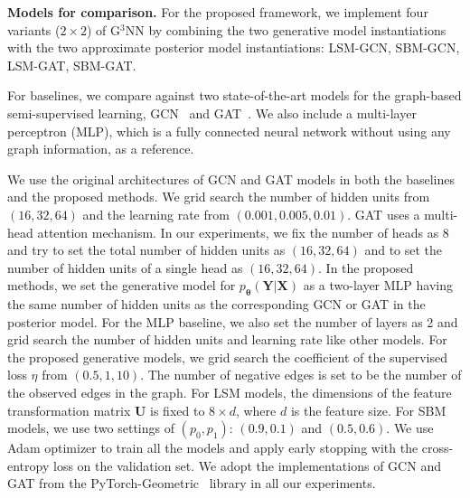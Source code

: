 \documentclass{article}
\newcommand{\vpara}[1]{\vspace{0.05in}\noindent\textbf{#1 }}
\def\rmX{{\mathbf{X}}}
\def\rmY{{\mathbf{Y}}}
\def\vtheta{{\bm{\theta}}}
\def\mU{{\bm{U}}}
\begin{document}
\vpara{Models for comparison.}
For the proposed framework, we implement four variants ($2\times 2$) of G$^3$NN by combining the two generative model instantiations with the two approximate posterior model instantiations: LSM-GCN, SBM-GCN, LSM-GAT, SBM-GAT.

For baselines, we compare against two state-of-the-art models for the graph-based semi-supervised learning, GCN~\cite{kipf2016semi} and GAT~\cite{velivckovic2017graph}. We also include a multi-layer perceptron (MLP), which is a fully connected neural network without using any graph information, as a reference. 

We use the original architectures of GCN and GAT models in both the baselines and the proposed methods. We grid search the number of hidden units from $(16, 32, 64)$ and the learning rate from $(0.001, 0.005, 0.01)$. GAT uses a multi-head attention mechanism. In our experiments, we fix the number of heads as 8 and try to set the total number of hidden units as $(16, 32, 64)$ and to set the number of hidden units of a single head as $(16, 32, 64)$. In the proposed methods, we set the generative model for $p_{\vtheta}(\rmY|\rmX)$ as a two-layer MLP having the same number of hidden units as the corresponding GCN or GAT in the posterior model. For the MLP baseline, we also set the number of layers as 2 and grid search the number of hidden units and learning rate like other models. For the proposed generative models, we grid search the coefficient of the supervised loss $\eta$ from $(0.5, 1, 10)$. The number of negative edges is set to be the number of the observed edges in the graph. For LSM models, the dimensions of the feature transformation matrix $\mU$ is fixed to $8 \times d$, where $d$ is the feature size. For SBM models, we use two settings of $(p_0, p_1)$: $(0.9, 0.1)$ and $(0.5, 0.6)$. We use Adam optimizer to train all the models and apply early stopping with the cross-entropy loss on the validation set. We adopt the implementations of GCN and GAT from the PyTorch-Geometric~\cite{fey2019fast} library in all our experiments.
\end{document}
